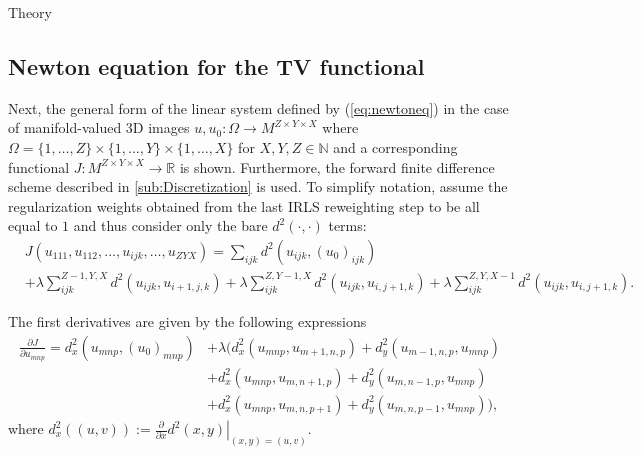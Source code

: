 \begin{chapter}{Theory}
\subsection{Newton equation for the TV functional} %
\label{sub:NewtonequationfortheTVfunctional}
Next, the general form of the linear system defined by (\ref{eq:newtoneq}) in the case of manifold-valued 3D images $u,u_0: \Omega\to M^{Z\times Y\times X}$
where $\Omega=\lbrace 1,\ldots, Z\rbrace\times\lbrace 1,\ldots, Y\rbrace\times\lbrace 1,\ldots, X\rbrace$ for $X,Y,Z\in\mathbb{N}$ and a corresponding functional $J:  M^{Z\times Y\times X} \to \mathbb{R}$ is shown.
Furthermore, the forward finite difference scheme described in \ref{sub:Discretization} is used. To simplify notation,
assume the regularization weights obtained from the last IRLS reweighting step to be all equal to $1$ and thus consider only the
bare $d^2(\cdot,\cdot)$ terms:
\begin{align}
    & J(u_{111},u_{112},\ldots,u_{ijk},\dots,u_{ZYX}) = \sum_{ijk} d^2(u_{ijk},(u_0)_{ijk}) \\ 
    &+ \lambda \sum_{ijk}^{Z-1,Y,X}d^{2}(u_{ijk},u_{i+1,j,k}) 
    + \lambda \sum_{ijk}^{Z,Y-1,X}d^{2}(u_{ijk},u_{i,j+1,k}) 
    + \lambda \sum_{ijk}^{Z,Y,X-1}d^{2}(u_{ijk},u_{i,j+1,k}). \nonumber 
\end{align}

The first derivatives are given by the following expressions
\begin{align}
    \label{eq:funcfirstder}
    \frac{\partial J}{\partial u_{mnp}} = d^2_x(u_{mnp},(u_0)_{mnp}) &+ \lambda 
	\big(
	    d_x^2(u_{mnp},u_{m+1,n,p}) +  d_y^2(u_{m-1,n,p},u_{mnp}) \\
	  &+  d_x^2(u_{mnp},u_{m,n+1,p}) +  d_y^2(u_{m,n-1,p},u_{mnp}) \nonumber \\
	  &+  d_x^2(u_{mnp},u_{m,n,p+1}) +  d_y^2(u_{m,n,p-1},u_{mnp})\big), \nonumber 
\end{align}
where $d^2_x((u,v)):=\frac{\partial}{\partial x}\left. d^2(x,y)\right\vert_{(x,y)=(u,v)}$.\\


\end{chapter}
